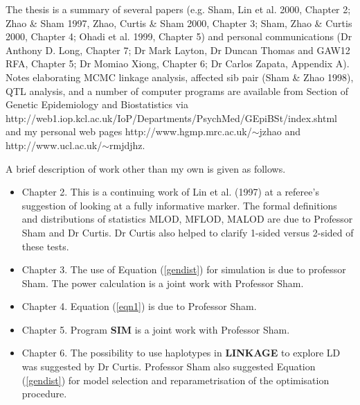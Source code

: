 The thesis is a summary of several papers (e.g.  Sham, Lin et al.  2000,
Chapter 2; Zhao \& Sham 1997, Zhao, Curtis \& Sham 2000, Chapter 3; Sham, Zhao
\& Curtis 2000, Chapter 4; Ohadi et al.  1999, Chapter 5) and personal
communications (Dr Anthony D.  Long, Chapter 7; Dr Mark Layton, Dr Duncan
Thomas and GAW12 RFA, Chapter 5; Dr Momiao Xiong, Chapter 6; Dr Carlos Zapata,
Appendix A).  Notes elaborating MCMC linkage analysis, affected sib pair (Sham
\& Zhao 1998), QTL analysis, and a number of computer programs are available
from Section of Genetic Epidemiology and Biostatistics via
http://web1.iop.kcl.ac.uk/IoP/Departments/PsychMed/GEpiBSt/index.shtml and my 
personal web pages http://www.hgmp.mrc.ac.uk/$\sim$jzhao and 
http://www.ucl.ac.uk/$\sim$rmjdjhz.

A brief description of work other than my own is given as follows.

\begin{itemize}

\item Chapter 2.  This is a continuing work of Lin et al.  (1997) at a
referee's suggestion of looking at a fully informative marker.  The formal
definitions and distributions of statistics MLOD, MFLOD, MALOD are due to
Professor Sham and Dr Curtis.  Dr Curtis also helped to clarify 1-sided versus
2-sided of these tests.

\item Chapter 3.  The use of Equation (\ref{gendist}) for simulation is due to
professor Sham. The power calculation is a joint work with Professor Sham.

\item Chapter 4. Equation (\ref{eqn1}) is due to Professor Sham.

\item Chapter 5. Program {\bf SIM} is a joint work with Professor Sham.

\item Chapter 6.  The possibility to use haplotypes in {\bf LINKAGE} to explore
LD was suggested by Dr Curtis.  Professor Sham also suggested Equation
(\ref{gendist}) for model selection and reparametrisation of the optimisation
procedure.

\end{itemize}
